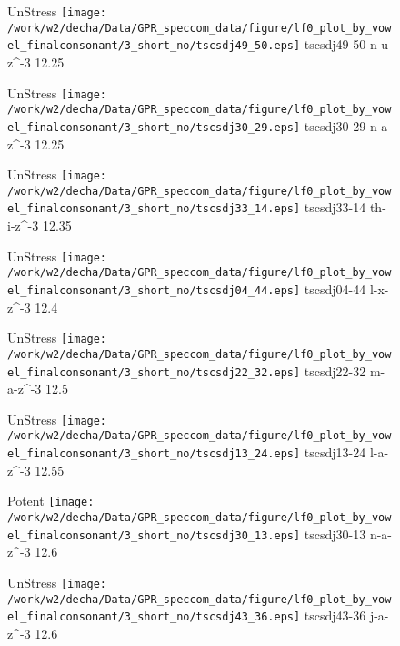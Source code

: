 \documentclass{article}
\begin{document}
\begin{figure}[t]
\begin{minipage}[b]{.24\textwidth}
UnStress
\centering
\texttt{[image: /work/w2/decha/Data/GPR\_speccom\_data/figure/lf0\_plot\_by\_vowel\_finalconsonant/3\_short\_no/tscsdj49\_50.eps]}
tscsdj49-50 n-u-z\textasciicircum-3 12.25
\end{minipage}
\begin{minipage}[b]{.24\textwidth}
UnStress
\centering
\texttt{[image: /work/w2/decha/Data/GPR\_speccom\_data/figure/lf0\_plot\_by\_vowel\_finalconsonant/3\_short\_no/tscsdj30\_29.eps]}
tscsdj30-29 n-a-z\textasciicircum-3 12.25
\end{minipage}
\begin{minipage}[b]{.24\textwidth}
UnStress
\centering
\texttt{[image: /work/w2/decha/Data/GPR\_speccom\_data/figure/lf0\_plot\_by\_vowel\_finalconsonant/3\_short\_no/tscsdj33\_14.eps]}
tscsdj33-14 th-i-z\textasciicircum-3 12.35
\end{minipage}
\begin{minipage}[b]{.24\textwidth}
UnStress
\centering
\texttt{[image: /work/w2/decha/Data/GPR\_speccom\_data/figure/lf0\_plot\_by\_vowel\_finalconsonant/3\_short\_no/tscsdj04\_44.eps]}
tscsdj04-44 l-x-z\textasciicircum-3 12.4
\end{minipage}
\end{figure}
\clearpage
\begin{figure}[t]
\begin{minipage}[b]{.24\textwidth}
UnStress
\centering
\texttt{[image: /work/w2/decha/Data/GPR\_speccom\_data/figure/lf0\_plot\_by\_vowel\_finalconsonant/3\_short\_no/tscsdj22\_32.eps]}
tscsdj22-32 m-a-z\textasciicircum-3 12.5
\end{minipage}
\begin{minipage}[b]{.24\textwidth}
UnStress
\centering
\texttt{[image: /work/w2/decha/Data/GPR\_speccom\_data/figure/lf0\_plot\_by\_vowel\_finalconsonant/3\_short\_no/tscsdj13\_24.eps]}
tscsdj13-24 l-a-z\textasciicircum-3 12.55
\end{minipage}
\begin{minipage}[b]{.24\textwidth}
\colorbox{Apricot}{Potent}
\centering
\texttt{[image: /work/w2/decha/Data/GPR\_speccom\_data/figure/lf0\_plot\_by\_vowel\_finalconsonant/3\_short\_no/tscsdj30\_13.eps]}
tscsdj30-13 n-a-z\textasciicircum-3 12.6
\end{minipage}
\begin{minipage}[b]{.24\textwidth}
UnStress
\centering
\texttt{[image: /work/w2/decha/Data/GPR\_speccom\_data/figure/lf0\_plot\_by\_vowel\_finalconsonant/3\_short\_no/tscsdj43\_36.eps]}
tscsdj43-36 j-a-z\textasciicircum-3 12.6
\end{minipage}
\end{figure}
\end{document}
